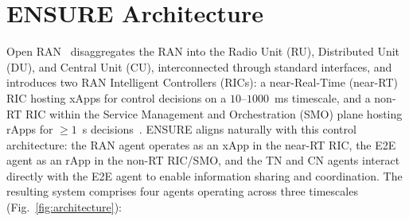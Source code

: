 \documentclass[12pt,lettersize,journal,onecolumn]{IEEEtran}
\begin{document}
\section{ENSURE Architecture} \label{section-architectural-framework} %
Open RAN~\cite{oran23architecture} disaggregates the RAN into the Radio Unit (RU), Distributed Unit (DU), and Central Unit (CU), interconnected through standard interfaces, and introduces two RAN Intelligent Controllers (RICs): a near-Real-Time (near-RT) RIC hosting xApps for control decisions on a $10$--$1000$~ms timescale, and a non-RT RIC within the Service Management and Orchestration (SMO) plane hosting rApps for $\geq1$~s decisions~\cite{comst23polese}. ENSURE aligns naturally with this control architecture: the RAN agent operates as an xApp in the near-RT RIC, the E2E agent as an rApp in the non-RT RIC/SMO, and the TN and CN agents interact directly with the E2E agent to enable information sharing and coordination. The resulting system comprises four agents operating across three timescales (Fig.~\ref{fig:architecture}):
\end{document}
